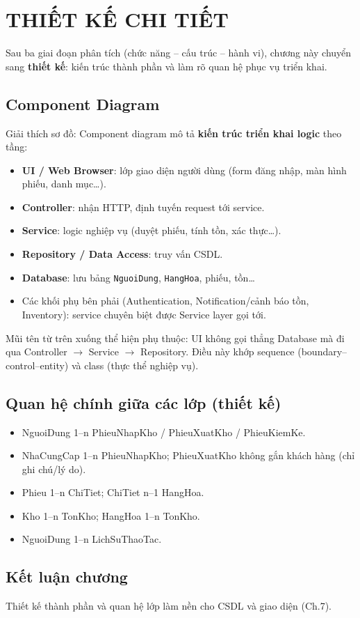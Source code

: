 \chapter{THIẾT KẾ CHI TIẾT}

Sau ba giai đoạn phân tích (chức năng -- cấu trúc -- hành vi), chương này chuyển sang \textbf{thiết kế}: kiến trúc thành phần và làm rõ quan hệ phục vụ triển khai.

\section{Component Diagram}



Giải thích sơ đồ: Component diagram mô tả \textbf{kiến trúc triển khai logic} theo tầng:
\begin{itemize}[leftmargin=1.5cm]
    \item \textbf{UI / Web Browser}: lớp giao diện người dùng (form đăng nhập, màn hình phiếu, danh mục\ldots).
    \item \textbf{Controller}: nhận HTTP, định tuyến request tới service.
    \item \textbf{Service}: logic nghiệp vụ (duyệt phiếu, tính tồn, xác thực\ldots).
    \item \textbf{Repository / Data Access}: truy vấn CSDL.
    \item \textbf{Database}: lưu bảng \texttt{NguoiDung}, \texttt{HangHoa}, phiếu, tồn\ldots
    \item Các khối phụ bên phải (Authentication, Notification/cảnh báo tồn, Inventory): service chuyên biệt được Service layer gọi tới.
\end{itemize}
Mũi tên từ trên xuống thể hiện phụ thuộc: UI không gọi thẳng Database mà đi qua Controller $\rightarrow$ Service $\rightarrow$ Repository. Điều này khớp sequence (boundary--control--entity) và class (thực thể nghiệp vụ).

\section{Quan hệ chính giữa các lớp (thiết kế)}

\begin{itemize}[leftmargin=1.5cm]
    \item NguoiDung 1--n PhieuNhapKho / PhieuXuatKho / PhieuKiemKe.
    \item NhaCungCap 1--n PhieuNhapKho; PhieuXuatKho không gắn khách hàng (chỉ ghi chú/lý do).
    \item Phieu 1--n ChiTiet; ChiTiet n--1 HangHoa.
    \item Kho 1--n TonKho; HangHoa 1--n TonKho.
    \item NguoiDung 1--n LichSuThaoTac.
\end{itemize}

\section{Kết luận chương}

Thiết kế thành phần và quan hệ lớp làm nền cho CSDL và giao diện (Ch.7).
